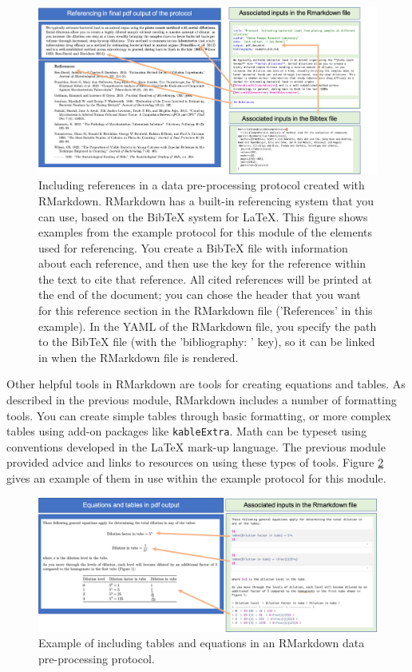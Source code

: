 \documentclass[]{tufte-book}
\begin{document}
\begin{figure}
\includegraphics[width=\textwidth]{figures/protocol_references} \caption[Including references in a data pre-processing protocol created with RMarkdown]{Including references in a data pre-processing protocol created with RMarkdown. RMarkdown has a built-in referencing system that you can use, based on the BibTeX system for LaTeX. This figure shows examples from the example protocol for this module of the elements used for referencing. You create a BibTeX file with information about each reference, and then use the key for the reference within the text to cite that reference. All cited references will be printed at the end of the document; you can chose the header that you want for this reference section in the RMarkdown file ('References' in this example). In the YAML of the RMarkdown file, you specify the path to the BibTeX file (with the 'bibliography: ' key), so it can be linked in when the RMarkdown file is rendered.}\label{fig:protocolreferences}
\end{figure}

Other helpful tools in RMarkdown are tools for creating equations and tables. As
described in the previous module, RMarkdown includes a number of formatting
tools. You can create simple tables through basic formatting, or more complex
tables using add-on packages like \texttt{kableExtra}. Math can be typeset using
conventions developed in the LaTeX mark-up language. The previous module
provided advice and links to resources on using these types of tools. Figure
\ref{fig:protocolequations} gives an example of them in use within the example
protocol for this module.

\begin{figure}
\includegraphics[width=\textwidth]{figures/protocol_equations_tables} \caption[Example of including tables and equations in an RMarkdown data pre-processing protocol]{Example of including tables and equations in an RMarkdown data pre-processing protocol.}\label{fig:protocolequations}
\end{figure}
\end{document}
